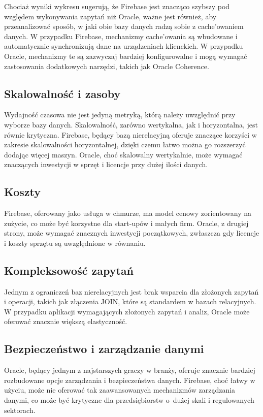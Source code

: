 Chociaż wyniki wykresu sugerują, że Firebase jest znacząco szybszy pod względem wykonywania zapytań niż Oracle, ważne jest również, aby przeanalizować sposób, w jaki obie bazy danych radzą sobie z cache'owaniem danych. W przypadku Firebase, mechanizmy cache'owania są wbudowane i automatycznie synchronizują dane na urządzeniach klienckich. W przypadku Oracle, mechanizmy te są zazwyczaj bardziej konfigurowalne i mogą wymagać zastosowania dodatkowych narzędzi, takich jak Oracle Coherence.

\subsection{Skalowalność i zasoby}
Wydajność czasowa nie jest jedyną metryką, którą należy uwzględnić przy wyborze bazy danych. Skalowalność, zarówno wertykalna, jak i horyzontalna, jest równie krytyczna. Firebase, będący bazą nierelacyjną oferuje znaczące korzyści w zakresie skalowalności horyzontalnej, dzięki czemu łatwo można go rozszerzyć dodając więcej maszyn. Oracle, choć skalowalny wertykalnie, może wymagać znaczących inwestycji w sprzęt i licencje przy dużej ilości danych.

\subsection{Koszty}
Firebase, oferowany jako usługa w chmurze, ma model cenowy zorientowany na zużycie, co może być korzystne dla start-upów i małych firm. Oracle, z drugiej strony, może wymagać znacznych inwestycji początkowych, zwłaszcza gdy licencje i koszty sprzętu są uwzględnione w równaniu.

\subsection{Kompleksowość zapytań}
Jednym z ograniczeń baz nierelacyjnych jest brak wsparcia dla złożonych zapytań i operacji, takich jak złączenia JOIN, które są standardem w bazach relacyjnych. W przypadku aplikacji wymagających złożonych zapytań i analiz, Oracle może oferować znacznie większą elastyczność.

\subsection{Bezpieczeństwo i zarządzanie danymi}
Oracle, będący jednym z najstarszych graczy w branży, oferuje znacznie bardziej rozbudowane opcje zarządzania i bezpieczeństwa danych. Firebase, choć łatwy w użyciu, może nie oferować tak zaawansowanych mechanizmów zarządzania danymi, co może być krytyczne dla przedsiębiorstw o~dużej skali i regulowanych sektorach.

